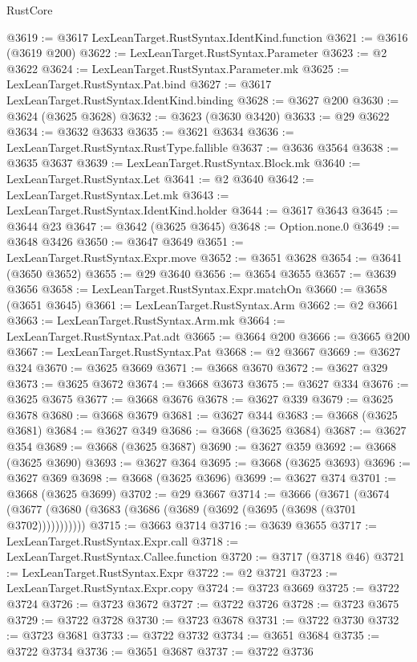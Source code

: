 \begin{lexlean}{RustCore}
\begin{coremodule}
@3619 := @3617 LexLeanTarget.RustSyntax.IdentKind.function
@3621 := @3616 (@3619 @200)
@3622 := LexLeanTarget.RustSyntax.Parameter
@3623 := @2 @3622
@3624 := LexLeanTarget.RustSyntax.Parameter.mk
@3625 := LexLeanTarget.RustSyntax.Pat.bind
@3627 := @3617 LexLeanTarget.RustSyntax.IdentKind.binding
@3628 := @3627 @200
@3630 := @3624 (@3625 @3628)
@3632 := @3623 (@3630 @3420)
@3633 := @29 @3622
@3634 := @3632 @3633
@3635 := @3621 @3634
@3636 := LexLeanTarget.RustSyntax.RustType.fallible
@3637 := @3636 @3564
@3638 := @3635 @3637
@3639 := LexLeanTarget.RustSyntax.Block.mk
@3640 := LexLeanTarget.RustSyntax.Let
@3641 := @2 @3640
@3642 := LexLeanTarget.RustSyntax.Let.mk
@3643 := LexLeanTarget.RustSyntax.IdentKind.holder
@3644 := @3617 @3643
@3645 := @3644 @23
@3647 := @3642 (@3625 @3645)
@3648 := Option.none.{0}
@3649 := @3648 @3426
@3650 := @3647 @3649
@3651 := LexLeanTarget.RustSyntax.Expr.move
@3652 := @3651 @3628
@3654 := @3641 (@3650 @3652)
@3655 := @29 @3640
@3656 := @3654 @3655
@3657 := @3639 @3656
@3658 := LexLeanTarget.RustSyntax.Expr.matchOn
@3660 := @3658 (@3651 @3645)
@3661 := LexLeanTarget.RustSyntax.Arm
@3662 := @2 @3661
@3663 := LexLeanTarget.RustSyntax.Arm.mk
@3664 := LexLeanTarget.RustSyntax.Pat.adt
@3665 := @3664 @200
@3666 := @3665 @200
@3667 := LexLeanTarget.RustSyntax.Pat
@3668 := @2 @3667
@3669 := @3627 @324
@3670 := @3625 @3669
@3671 := @3668 @3670
@3672 := @3627 @329
@3673 := @3625 @3672
@3674 := @3668 @3673
@3675 := @3627 @334
@3676 := @3625 @3675
@3677 := @3668 @3676
@3678 := @3627 @339
@3679 := @3625 @3678
@3680 := @3668 @3679
@3681 := @3627 @344
@3683 := @3668 (@3625 @3681)
@3684 := @3627 @349
@3686 := @3668 (@3625 @3684)
@3687 := @3627 @354
@3689 := @3668 (@3625 @3687)
@3690 := @3627 @359
@3692 := @3668 (@3625 @3690)
@3693 := @3627 @364
@3695 := @3668 (@3625 @3693)
@3696 := @3627 @369
@3698 := @3668 (@3625 @3696)
@3699 := @3627 @374
@3701 := @3668 (@3625 @3699)
@3702 := @29 @3667
@3714 := @3666
    (@3671 (@3674 (@3677 (@3680 (@3683 (@3686 (@3689 (@3692 (@3695 (@3698 (@3701 @3702)))))))))))
@3715 := @3663 @3714
@3716 := @3639 @3655
@3717 := LexLeanTarget.RustSyntax.Expr.call
@3718 := LexLeanTarget.RustSyntax.Callee.function
@3720 := @3717 (@3718 @46)
@3721 := LexLeanTarget.RustSyntax.Expr
@3722 := @2 @3721
@3723 := LexLeanTarget.RustSyntax.Expr.copy
@3724 := @3723 @3669
@3725 := @3722 @3724
@3726 := @3723 @3672
@3727 := @3722 @3726
@3728 := @3723 @3675
@3729 := @3722 @3728
@3730 := @3723 @3678
@3731 := @3722 @3730
@3732 := @3723 @3681
@3733 := @3722 @3732
@3734 := @3651 @3684
@3735 := @3722 @3734
@3736 := @3651 @3687
@3737 := @3722 @3736

\end{coremodule}
\end{lexlean}
